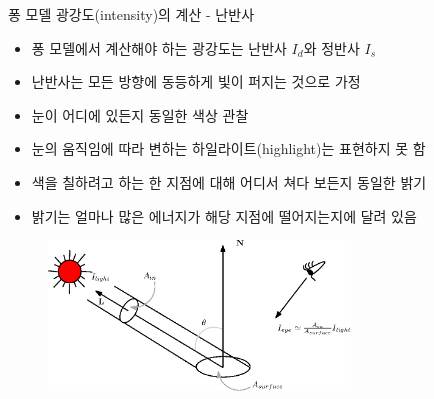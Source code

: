 \begin{frame}[fragile]{퐁 모델 광강도(intensity)의 계산 - 난반사}

\begin{itemize}
\item 퐁 모델에서 계산해야 하는 광강도는 난반사 $I_d$와 정반사 $I_s$
\item 난반사는 모든 방향에 동등하게 빛이 퍼지는 것으로 가정
\item 눈이 어디에 있든지 동일한 색상 관찰
\item 눈의 움직임에 따라 변하는 하일라이트(highlight)는 표현하지 못 함
\item 색을 칠하려고 하는 한 지점에 대해 어디서 쳐다 보든지 동일한 밝기
\item 밝기는 얼마나 많은 에너지가 해당 지점에 떨어지는지에 달려 있음
\end{itemize}

\begin{figure}[h!]
  \centering
    \includegraphics[height=4cm]{Math_lighting/diffuseConcept.eps}
\end{figure}


\end{frame}

